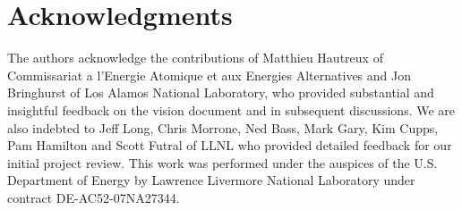 \section {Acknowledgments}
The authors acknowledge the contributions of Matthieu Hautreux
of Commissariat a l'Energie Atomique et aux Energies Alternatives
and Jon Bringhurst of Los Alamos National Laboratory, who provided
substantial and insightful feedback on the \flux vision document
and in subsequent discussions.
We are also indebted to 
Jeff Long, Chris Morrone, Ned Bass,
Mark Gary, Kim Cupps, Pam Hamilton and Scott Futral
of LLNL who provided detailed feedback for our initial project review.
This work was performed under the auspices of the U.S. Department
of Energy by Lawrence Livermore National Laboratory under
contract DE-AC52-07NA27344.

